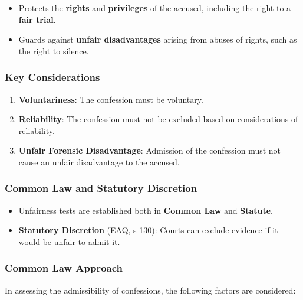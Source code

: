 \begin{itemize}
\tightlist
\item
  Protects the \textbf{rights} and \textbf{privileges} of the accused,
  including the right to a \textbf{fair trial}.
\item
  Guards against \textbf{unfair disadvantages} arising from abuses of
  rights, such as the right to silence.
\end{itemize}

\subsubsection{Key Considerations}\label{key-considerations-1}

\begin{enumerate}
\def\labelenumi{\arabic{enumi}.}
\tightlist
\item
  \textbf{Voluntariness}: The confession must be voluntary.
\item
  \textbf{Reliability}: The confession must not be excluded based on
  considerations of reliability.
\item
  \textbf{Unfair Forensic Disadvantage}: Admission of the confession
  must not cause an unfair disadvantage to the accused.
\end{enumerate}

\subsubsection{Common Law and Statutory
Discretion}\label{common-law-and-statutory-discretion}

\begin{itemize}
\tightlist
\item
  Unfairness tests are established both in \textbf{Common Law} and
  \textbf{Statute}.
\item
  \textbf{Statutory Discretion} (EAQ, s 130): Courts can exclude
  evidence if it would be unfair to admit it.
\end{itemize}

\subsubsection{Common Law Approach}\label{common-law-approach}

In assessing the admissibility of confessions, the following factors are
considered:

